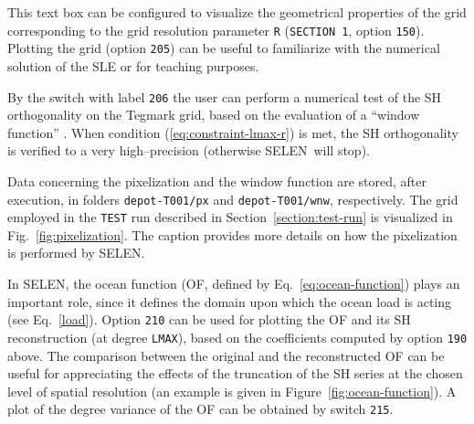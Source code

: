 \documentclass[11pt,fleqn,a4paper,titlepage]{article}
\newcommand\selen{\textsf{SELEN~}}
\newcommand\selens{\textsf{SELEN}}
\begin{document}
\vspace{0.4cm}

{\color{Magenta}{\scriptsize\begin{verbatim}
    ...
    ====> PIXELIZATION & WINDOW ---------------------------------------------------
    205    Pixelization maps (y/n)                               'y'
    206    Window function evaluation & plot (y/n)                   'n'
    ...
\end{verbatim} }}
\noindent This text box can be configured to visualize the geometrical properties of the grid corresponding to the grid resolution parameter \texttt{R} (\texttt{SECTION 1}, option \texttt{150}). Plotting the grid (option \texttt{205}) can be useful to familiarize with the numerical solution of the SLE or for teaching purposes. 

By the switch with label \texttt{206} the user can perform a numerical test of the SH orthogonality on the Tegmark grid, based on the evaluation of a ``window function'' \citep{Tegmark_1996}. When condition (\ref{eq:constraint-lmax-r}) is met, the SH orthogonality is verified to a very high--precision (otherwise
\selen will stop). 

Data concerning the pixelization and the window function are stored, after execution,
in folders \texttt{depot-T001/px} and \texttt{depot-T001/wnw}, respectively. The grid 
employed in the \texttt{TEST} run described in Section~\ref{section:test-run}
is visualized in 
Fig.~\ref{fig:pixelization}. The caption provides more details 
on how the pixelization is performed by \selens. 

\vspace{0.4cm}

{\color{Magenta}{\scriptsize\begin{verbatim}
    ...
    ====> OCEAN FUNCTION (OF) -----------------------------------------------------
    210    Present-day OF map & reconstruction (y/n)                'y'
    215    Plot of OF degree variance (y/n)                            'n'
    ...
\end{verbatim} }}
\noindent In \selens, the ocean function (OF, defined by Eq.~\ref{eq:ocean-function}) plays an important role, since it defines the domain upon which the ocean load is acting (see Eq.~\ref{load}).
Option \texttt{210} can be used for plotting the OF and its SH reconstruction (at degree \texttt{LMAX}),
based on the coefficients computed by option \texttt{190} above. 
The comparison between the original and the reconstructed OF can be useful for appreciating the effects of the truncation of the SH series at the chosen level of spatial resolution (an example is given in 
Figure~\ref{fig:ocean-function}). 
A plot of the degree variance of the OF can be obtained by switch \texttt{215}. 
\end{document}
